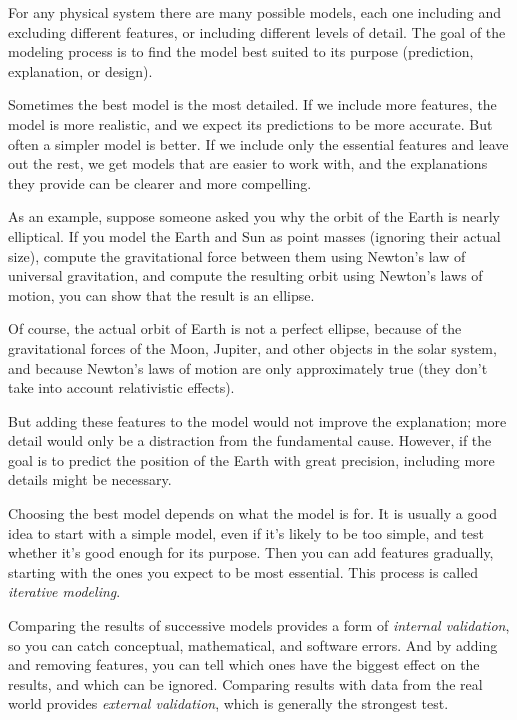 
For any physical system there are many possible models, each one including and excluding different features, or including different levels of detail.  The goal of the modeling process is to find the model best suited to its purpose (prediction, explanation, or design).


Sometimes the best model is the most detailed.  If we include more features, the model is more realistic, and we expect its predictions to be more accurate.  
But often a simpler model is better.  If we include only the essential features and leave out the rest, we get models that are easier to work with, and the explanations they provide can be clearer and more compelling. 

As an example, suppose someone asked you why the orbit of the Earth is nearly elliptical.  If you model the Earth and Sun as point masses (ignoring their actual size), compute the gravitational force between them using Newton's law of universal gravitation, and compute the resulting orbit using Newton's laws of motion, you can show that the result is an ellipse.

Of course, the actual orbit of Earth is not a perfect ellipse, because of the gravitational forces of the Moon, Jupiter, and other objects in the solar system, and because Newton's laws of motion are only approximately true (they don't take into account relativistic effects).
%
%

But adding these features to the model would not improve the explanation; more detail would only be a distraction from the fundamental cause.  However, if the goal is to predict the position of the Earth with great precision, including more details might be necessary.  

Choosing the best model depends on what the model is for.  It is usually a good idea to start with a simple model, even if it's likely to be too simple, and test whether it's good enough for its purpose.  Then you can add features gradually, starting with the ones you expect to be most essential.  This process is called \emph{iterative modeling}.


Comparing the results of successive models provides a form of \emph{internal validation}, so you can catch conceptual, mathematical, and software errors.  And by adding and removing features, you can tell which ones have the biggest effect on the results, and which can be ignored.
%
%
%
%
Comparing results with data from the real world provides \emph{external validation}, which is generally the strongest test.

